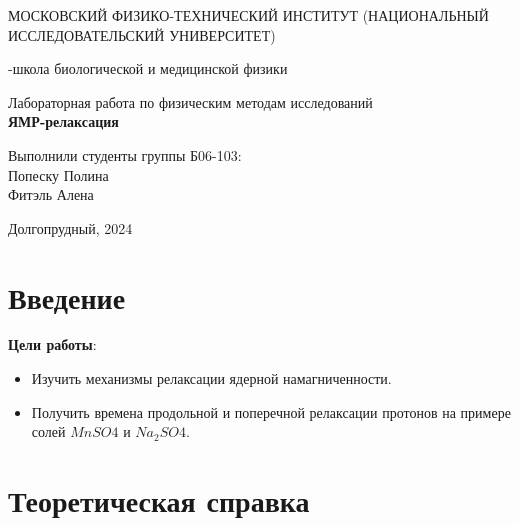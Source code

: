 \documentclass{article}
\begin{document}
\begin{titlepage}
\begin{center}
    {\large МОСКОВСКИЙ ФИЗИКО-ТЕХНИЧЕСКИЙ ИНСТИТУТ (НАЦИОНАЛЬНЫЙ ИССЛЕДОВАТЕЛЬСКИЙ УНИВЕРСИТЕТ)}
\end{center}
\begin{center}
    {-школа биологической и медицинской физики}
\end{center}


    \vspace{7cm}


\vspace{0.1cm}
{\huge
\begin{center}
    {Лабораторная работа по физическим методам исследований}\\
    {\bf ЯМР-релаксация}
\end{center}
}
\vspace{4cm}
\begin{flushright}
{\LARGE Выполнили студенты группы Б06-103:\\ Попеску Полина\\ Фитэль Алена\\ }

\end{flushright}
\vspace{4cm}
\begin{center}
    Долгопрудный, 2024
    
\end{center}
\end{titlepage}

\newpage
\setcounter{page}{2}   %
\tableofcontents
\bigskip 


\newpage


\section{Введение}

\textbf{Цели работы}: 
\begin{itemize}
\item Изучить механизмы релаксации ядерной намагниченности.
\item Получить времена продольной и поперечной релаксации протонов на примере солей $MnSO4$ и $Na{_2}SO4$.
\end{itemize}

\section{Теоретическая справка}
\end{document}
